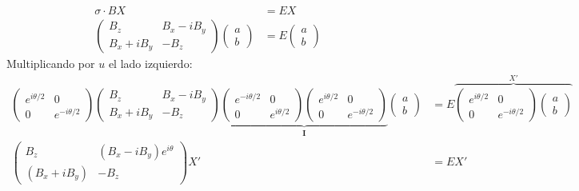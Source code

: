 \documentclass[a4paper,12pt]{article}
\begin{document}
\begin{align*}
    \sigma\cdot B X &= EX\\
    \begin{pmatrix}
        B_z& B_x-i B_y \\B_x+iB_y & - B_z 
    \end{pmatrix} \begin{pmatrix}
        a\\b
    \end{pmatrix} &= E \begin{pmatrix}
        a\\b
    \end{pmatrix}
\end{align*}
Multiplicando por $u$ el lado izquierdo: 
\begin{align*}
    \begin{pmatrix}
            e^{i \theta/2 } &0 \\ 0 & e^{-i \theta/2}
        \end{pmatrix}\begin{pmatrix}
        B_z& B_x-i B_y \\B_x+iB_y & - B_z 
    \end{pmatrix}\underbrace{\begin{pmatrix}
            e^{-i \theta/2 } &0 \\ 0 & e^{i \theta/2}
        \end{pmatrix}\begin{pmatrix}
            e^{i \theta/2 } &0 \\ 0 & e^{-i \theta/2}
        \end{pmatrix}  }_{\mathbf{I}}  \begin{pmatrix} 
        a\\b
    \end{pmatrix} &= E \overbrace{\begin{pmatrix}
            e^{i \theta/2 } &0 \\ 0 & e^{-i \theta/2}
        \end{pmatrix} \begin{pmatrix}
        a\\b
    \end{pmatrix}}^{X'} \\
     \begin{pmatrix}
         B_z & (B_x-i B_y) e^{i \theta} \\ (B_x+iB_y) &-B_z
     \end{pmatrix}X' &= EX' \\
\end{align*}
\end{document}
